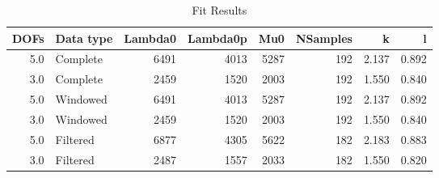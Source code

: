 \begin{table}
\centering
\caption{Fit Results}
\begin{tabular}{rlrrrrrr}
\toprule
 DOFs & Data type &  Lambda0 &  Lambda0p &   Mu0 &  NSamples &      k &      l \\
\midrule
  5.0 &  Complete &     6491 &      4013 &  5287 &       192 &  2.137 &  0.892 \\
  3.0 &  Complete &     2459 &      1520 &  2003 &       192 &  1.550 &  0.840 \\
  5.0 &  Windowed &     6491 &      4013 &  5287 &       192 &  2.137 &  0.892 \\
  3.0 &  Windowed &     2459 &      1520 &  2003 &       192 &  1.550 &  0.840 \\
  5.0 &  Filtered &     6877 &      4305 &  5622 &       182 &  2.183 &  0.883 \\
  3.0 &  Filtered &     2487 &      1557 &  2033 &       182 &  1.550 &  0.820 \\
\bottomrule
\end{tabular}
\end{table}
